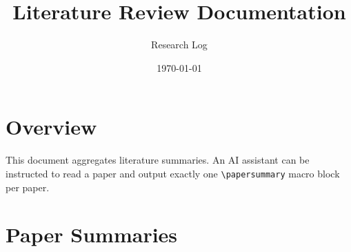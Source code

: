 \documentclass[11pt,a4paper]{article}
\title{Literature Review Documentation}
\author{Research Log}
\date{\today}
\begin{document}
\maketitle

\section*{Overview}
This document aggregates literature summaries. An AI assistant can be instructed to read a paper and output exactly one \texttt{\textbackslash papersummary} macro block per paper.

\section*{Paper Summaries}

\end{document}
